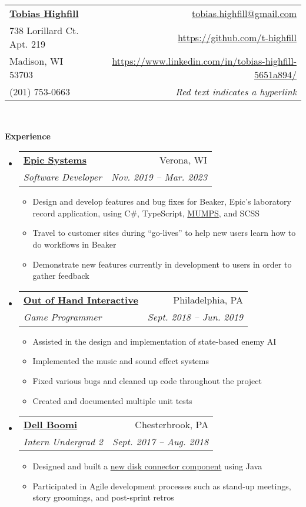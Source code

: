 \documentclass[letterpaper,11pt]{article}
\makeatletter
\newcommand{\resitem}[1]{\item #1 \vspace{-2pt}}
\newcommand{\resheading}[1]{{\large \colorbox{mygrey}{\begin{minipage}{\textwidth}{\textbf{#1 \vphantom{p\^{E}}}}\end{minipage}}}}
\newcommand{\ressubheading}[4]{
\begin{tabular*}{6.5in}{l@{\extracolsep{\fill}}r}
		\textbf{#1} & #2 \\
		\textit{#3} & \textit{#4} \\
\end{tabular*}\vspace{-6pt}}
\newcommand{\myemail}{tobias.highfill@gmail.com}
\newcommand{\mywebsite}{https://github.com/t-highfill}
\newcommand{\linkedin}{https://www.linkedin.com/in/tobias-highfill-5651a894/}
\newcommand{\smallsect}[1]{{\footnotesize #1}}
\makeatother
\begin{document}
\newcommand{\myheader}{
\begin{tabular*}{7in}{l@{\extracolsep{\fill}}r}
	\textbf{\href{\mywebsite}{\LARGE Tobias Highfill}} & \href{mailto:\myemail}{\myemail}\\
	738 Lorillard Ct. Apt. 219 & \href{\mywebsite}{\mywebsite} \\
	Madison, WI 53703 & \href{\linkedin}{\linkedin} \\
	(201) 753-0663 & \smallsect{\textit{Red text indicates a hyperlink}} \\
	\end{tabular*}
\\
\vspace{0.1in}}

\myheader

\resheading{Experience}
\begin{itemize}
	\item \ressubheading{\href{https://www.epic.com/}{Epic Systems}}{Verona, WI}{Software Developer}{Nov. 2019 -- Mar. 2023}
		\smallsect{
		\begin{itemize}
			\resitem{Design and develop features and bug fixes for Beaker, Epic's laboratory record application, using C\#, TypeScript, \href{https://en.wikipedia.org/wiki/MUMPS}{MUMPS}, and SCSS}
			\resitem{Travel to customer sites during ``go-lives'' to help new users learn how to do workflows in Beaker}
			\resitem{Demonstrate new features currently in development to users in order to gather feedback}
		\end{itemize}
		}
	\item \ressubheading{\href{https://outofhandinteractive.wordpress.com/}{Out of Hand Interactive}}{Philadelphia, PA}{Game Programmer}{Sept. 2018 -- Jun. 2019}
		\smallsect{
		\begin{itemize}
			\resitem{Assisted in the design and implementation of state-based enemy AI}
			\resitem{Implemented the music and sound effect systems}
			\resitem{Fixed various bugs and cleaned up code throughout the project}
			\resitem{Created and documented multiple unit tests}
		\end{itemize}
		}
	\item \ressubheading{\href{https://boomi.com/}{Dell Boomi}}{Chesterbrook, PA}{Intern Undergrad 2}{Sept. 2017 -- Aug. 2018}
		\smallsect{
		\begin{itemize}
			\resitem{Designed and built a \href{https://help.boomi.com/bundle/connectors/page/int-Disk_v2_connector.html}{new disk connector component} using Java}
			\resitem{Participated in Agile development processes such as stand-up meetings, story groomings, and post-sprint retros}

\end{itemize}}
\end{itemize}
\end{document}
